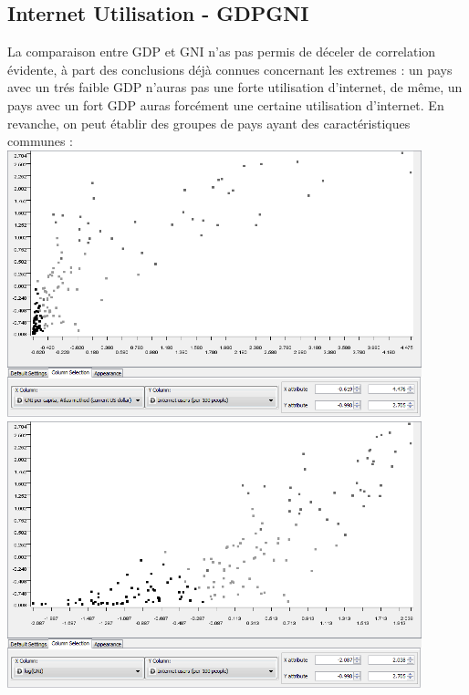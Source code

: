     \subsection{Internet Utilisation - GDP\/GNI}
        La comparaison entre GDP et GNI n'as pas permis de déceler de correlation évidente, à part des conclusions déjà connues concernant les extremes : un pays avec un trés faible GDP n'auras pas une forte utilisation d'internet, de même, un pays avec un fort GDP auras forcément une certaine utilisation d'internet.
        En revanche, on peut établir des groupes de pays ayant des caractéristiques communes :\\
        \includegraphics[width=0.9\textwidth]{InternetGNI.png}\\
		\includegraphics[width=0.9\textwidth]{InternetLogGNI.png}\\
        
